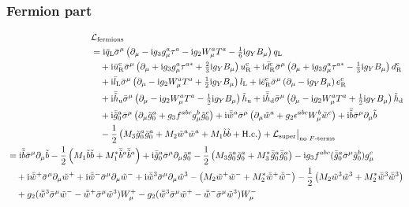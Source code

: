 \documentclass[CheatSheet]{subfiles}
\begin{document}
\subsubsection{Fermion part}
\begin{align}
 \begin{split}
  &\mathcal L\w{fermions}\\
&=
    \ii\bqL\bsigma^\mu \left(\partial_\mu - \ii g_3 g_\mu^a\tau^a - \ii g_2 W_\mu^a T^a - \tfrac16 \ii g_Y B_\mu\right)\qL
\\&\quad
 +  \ii\buR^\cc\bsigma^\mu \left(\partial_\mu + \ii g_3 g_\mu^a\tau^{a*} + \tfrac23 \ii g_Y B_\mu\right)\uR^\cc
 +  \ii\bdR^\cc\bsigma^\mu\left(\partial_\mu + \ii g_3 g_\mu^a\tau^{a*} - \tfrac13 \ii g_Y B_\mu\right)\dR^\cc
\\&\quad
 +  \ii\blL\bsigma^\mu \left(\partial_\mu - \ii g_2 W_\mu^aT^a + \tfrac12 \ii g_Y B_\mu\right)\lL
 +  \ii\beR^\cc\bsigma^\mu\left(\partial_\mu - \ii g_Y B_\mu\right)\eR^\cc
\\&\quad
 +  \ii\bthu\bsigma^\mu\left(\partial_\mu - \ii g_2 W_\mu^aT^a - \tfrac12 \ii g_Y B_\mu\right)\thu
 +  \ii\bthd\bsigma^\mu\left(\partial_\mu - \ii g_2 W_\mu^aT^a + \tfrac12 \ii g_Y B_\mu\right)\thd
\\&\quad
 + \ii\bar\tig_0^a\bsigma^\mu\left(\partial_\mu\tig_0^a + g_3f^{abc}g_\mu^b\tig_0^c\right)
 + \ii\bar\tiw^a\bsigma^\mu\left(\partial_\mu\tiw^a + g_2\epsilon^{abc}W^b_\mu\tiw^c\right)
 + \ii\bar\tib\bsigma^\mu\partial_\mu\tib
\\&\quad
 - \frac12\left(M_3\tig_0^a\tig_0^a+M_2\tiw^a\tiw^a+M_1\tib\tib+\text{H.c.}\right)
 + \mathcal L\w{super}\big|_{\text{no $F$-terms}}
 \end{split}
\\
\begin{split}
&=
 \ii\bar\tib\bsigma^\mu\partial_\mu\tib - \frac12\left(M_1\tib\tib+M_1^*\bar\tib^a\bar\tib^a\right)
 + \ii\bar\tig_0^a\bsigma^\mu\partial_\mu\tig_0^a - \frac12\left(M_3\tig_0^a\tig_0^a+M_3^*\bar\tig_0^a\bar\tig_0^a\right)
 - \ii g_3 f^{abc} (\bar\tig_0^a\bsigma^\mu\tig_0^b) g_\mu^c
\\&\quad
 + \ii\bar\tiw^+\bsigma^\mu \partial_\mu\tiw^+
 + \ii\bar\tiw^-\bsigma^\mu \partial_\mu\tiw^-
 + \ii\bar\tiw^3\bsigma^\mu \partial_\mu\tiw^3
 -\left(M_2\tiw^+\tiw^- + M_2^*\bar\tiw^+\bar\tiw^-\right)
 -\frac12\left(M_2\tiw^3\tiw^3 + M_2^*\bar\tiw^3\bar\tiw^3\right)
\\&\quad
 + g_2(\bar{\tiw}^{3}\bsigma^\mu\tiw^{-} - \bar{\tiw}^{+}\bsigma^\mu\tiw^{3})W_{\mu}^{+}
 - g_2(\bar{\tiw}^{3}\bsigma^\mu\tiw^{+} - \bar{\tiw}^{-}\bsigma^\mu\tiw^{3})W_{\mu}^{-}

\end{split}
\end{align}
\end{document}
